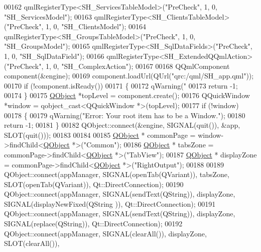 \begin{DoxyCode}
{00162         qmlRegisterType<SH\_ServicesTableModel>(\textcolor{stringliteral}{"PreCheck"}, 1, 0, \textcolor{stringliteral}{"SH\_ServicesModel"});
00163         qmlRegisterType<SH\_ClientsTableModel>(\textcolor{stringliteral}{"PreCheck"}, 1, 0, \textcolor{stringliteral}{"SH\_ClientsModel"});
00164         qmlRegisterType<SH\_GroupsTableModel>(\textcolor{stringliteral}{"PreCheck"}, 1, 0, \textcolor{stringliteral}{"SH\_GroupsModel"});
00165         qmlRegisterType<SH\_SqlDataFields>(\textcolor{stringliteral}{"PreCheck"}, 1, 0, \textcolor{stringliteral}{"SH\_SqlDataField"});
00166         qmlRegisterType<SH\_ExtendedQQmlAction>(\textcolor{stringliteral}{"PreCheck"}, 1, 0, \textcolor{stringliteral}{"SH\_ComplexAction"});
00167 
00168         QQmlComponent component(&engine);
00169         component.loadUrl(QUrl(\textcolor{stringliteral}{"qrc:/qml/SH\_app.qml"}));
00170         \textcolor{keywordflow}{if} (!component.isReady())
00171         \{
00172             qWarning(\textcolor{stringliteral}{"%
00173             \textcolor{keywordflow}{return} -1;
00174         \}
00175         \hyperlink{classQObject}{QObject} *topLevel = component.create();
00176         QQuickWindow *window = qobject\_cast<QQuickWindow *>(topLevel);
00177         \textcolor{keywordflow}{if} (!window)
00178         \{
00179             qWarning(\textcolor{stringliteral}{"Error: Your root item has to be a Window."});
00180             \textcolor{keywordflow}{return} -1;
00181         \}
00182         QObject::connect(&engine, SIGNAL(quit()), &app, SLOT(quit()));
00183 
00184 
00185         \hyperlink{classQObject}{QObject} * commonPage = window->findChild<\hyperlink{classQObject}{QObject} *>(\textcolor{stringliteral}{"Common"});
00186         \hyperlink{classQObject}{QObject} * tabsZone = commonPage->findChild<\hyperlink{classQObject}{QObject} *>(\textcolor{stringliteral}{"TabView"});
00187         \hyperlink{classQObject}{QObject} * displayZone = commonPage->findChild<\hyperlink{classQObject}{QObject} *>(\textcolor{stringliteral}{"RightOutput"});
00188 
00189         QObject::connect(appManager, SIGNAL(openTab(QVariant)), tabsZone, SLOT(openTab(QVariant)), 
      Qt::DirectConnection);
00190         QObject::connect(appManager, SIGNAL(sendText(QString)), displayZone, SIGNAL(displayNewFixed(QString
      )), Qt::DirectConnection);
00191         QObject::connect(appManager, SIGNAL(sendText(QString)), displayZone, SIGNAL(replace(QString)), 
      Qt::DirectConnection);
00192         QObject::connect(appManager, SIGNAL(clearAll()), displayZone, SLOT(clearAll()), 
}}
\end{DoxyCode}
